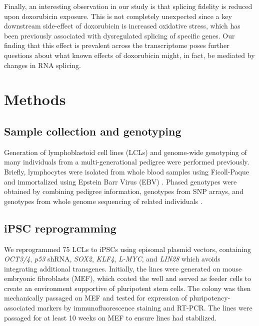 \documentclass{article}
\begin{document}
Finally, an interesting observation in our study is that splicing fidelity is reduced upon doxorubicin exposure. This is not completely unexpected since a key downstream side-effect of doxorubicin is increased oxidative stress, which has been previously associated with dysregulated splicing of specific genes\cite{Disher2007,Seo2016}. Our finding that this effect is prevalent across the transcriptome poses further questions about what known effects of  doxorubicin might, in fact, be mediated by changes in RNA splicing. 


\section*{Methods} 

\subsection*{Sample collection and genotyping}

Generation of lymphoblastoid cell lines (LCLs) and genome-wide genotyping of
many individuals from a multi-generational pedigree were performed
previously. Briefly, lymphocytes were isolated from whole blood samples using Ficoll-Paque and immortalized using Epstein Barr Virus (EBV) \cite{Cusanovich2012,
Cusanovich2016}. Phased genotypes were obtained by combining pedigree
information, genotypes from SNP arrays, and genotypes from whole genome
sequencing of related individuals \cite{Livne2015}.

\subsection*{iPSC reprogramming} 

We reprogrammed 75 LCLs to iPSCs using episomal plasmid vectors, containing \emph{OCT3/4}, \emph{p53} shRNA, \emph{SOX2}, \emph{KLF4}, \emph{L-MYC}, and \emph{LIN28} which avoids integrating additional transgenes\cite{Okita2011}. 
Initially, the lines were generated on mouse embryonic fibroblasts (MEF), which coated the well and served as feeder cells to create an environment supportive of pluripotent stem cells.  
The colony was then mechanically passaged on MEF and tested for expression of pluripotency-associated markers by immunofluorescence staining and RT-PCR. 
The lines were passaged for at least 10 weeks on MEF to ensure lines had stabilized. 
\end{document}
